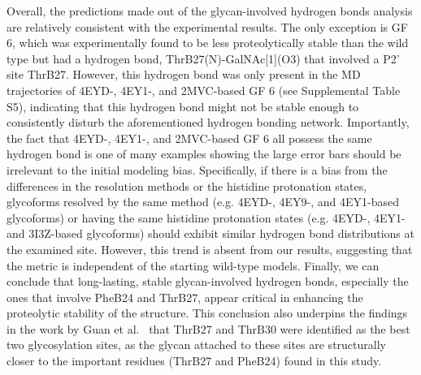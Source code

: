 \documentclass[sn-vancouver]{sn-jnl}
\begin{document}
Overall, the predictions made out of the glycan-involved hydrogen bonds analysis are relatively consistent with the experimental results. The only exception is GF 6, which was experimentally found to be less proteolytically stable than the wild type but had a hydrogen bond, ThrB27(N)-GalNAc[1](O3) that involved a P2' site ThrB27. However, this hydrogen bond was only present in the MD trajectories of 4EYD-, 4EY1-, and 2MVC-based GF 6 (see Supplemental Table S5), indicating that this hydrogen bond might not be stable enough to consistently disturb the aforementioned hydrogen bonding network. Importantly, the fact that 4EYD-, 4EY1-, and 2MVC-based GF 6 all possess the same hydrogen bond is one of many examples showing the large error bars should be irrelevant to the initial modeling bias. Specifically, if there is a bias from the differences in the resolution methods or the histidine protonation states, glycoforms resolved by the same method (e.g. 4EYD-, 4EY9-, and 4EY1-based glycoforms) or having the same histidine protonation states (e.g. 4EYD-, 4EY1- and 3I3Z-based glycoforms) should exhibit similar hydrogen bond distributions at the examined site. However, this trend is absent from our results, suggesting that the metric is independent of the starting wild-type models. Finally, we can conclude that long-lasting, stable glycan-involved hydrogen bonds, especially the ones that involve PheB24 and ThrB27, appear critical in enhancing the proteolytic stability of the structure. This conclusion also underpins the findings in the work by Guan et al.~\cite{guan2018chemically} that ThrB27 and ThrB30 were identified as the best two glycosylation sites, as the glycan attached to these sites are structurally closer to the important residues (ThrB27 and PheB24) found in this study. 
\end{document}
